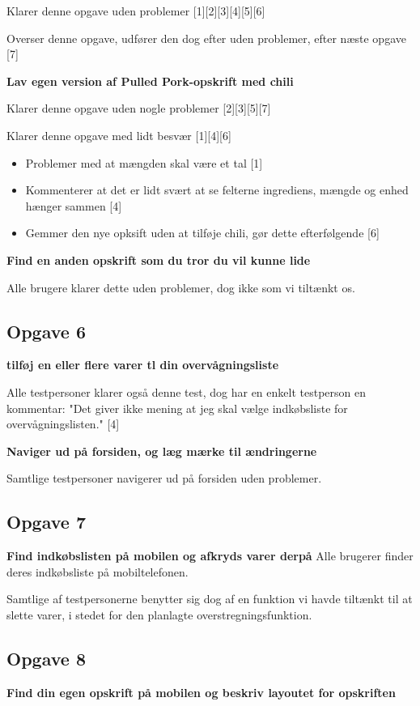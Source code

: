 Klarer denne opgave uden problemer [1][2][3][4][5][6]

Overser denne opgave, udfører den dog efter uden problemer, efter næste opgave [7]   

\textbf{Lav egen version af Pulled Pork-opskrift med chili}

Klarer denne opgave uden nogle problemer [2][3][5][7]

Klarer denne opgave med lidt besvær [1][4][6]
\begin{itemize}
	\item Problemer med at mængden skal være et tal [1]
	\item Kommenterer at det er lidt svært at se felterne ingrediens, mængde og enhed hænger sammen [4]
	\item Gemmer den nye opksift uden at tilføje chili, gør dette efterfølgende [6]
\end{itemize}

\textbf{Find en anden opskrift som du tror du vil kunne lide}

Alle brugere klarer dette uden problemer, dog ikke som vi tiltænkt os.

\subsection{Opgave 6}
\textbf{tilføj en eller flere varer tl din overvågningsliste}

Alle testpersoner klarer også denne test, dog har en enkelt testperson en kommentar: "Det giver ikke mening at jeg skal vælge indkøbsliste for overvågningslisten." [4] 

\textbf{Naviger ud på forsiden, og læg mærke til ændringerne}

Samtlige testpersoner navigerer ud på forsiden uden problemer.

\subsection{Opgave 7}
\textbf{Find indkøbslisten på mobilen og afkryds varer derpå}
Alle brugerer finder deres indkøbsliste på mobiltelefonen.

Samtlige af testpersonerne benytter sig dog af en funktion vi havde tiltænkt til at slette varer, i stedet for den planlagte overstregningsfunktion.

\subsection{Opgave 8}
\textbf{Find din egen opskrift på mobilen og beskriv layoutet for opskriften}


